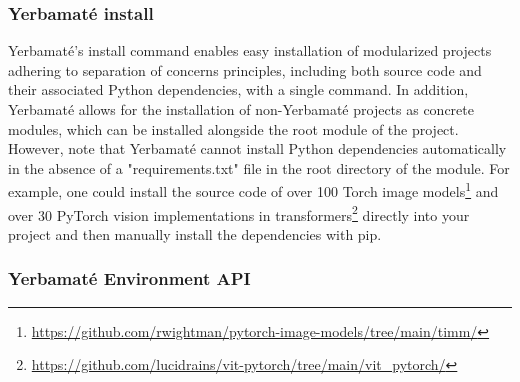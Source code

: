 \subsubsection{Yerbamaté install}
Yerbamaté's install command enables easy installation of modularized projects adhering to separation of concerns principles, including both source code and their associated Python dependencies, with a single command. In addition, Yerbamaté allows for the installation of non-Yerbamaté projects as concrete modules, which can be installed alongside the root module of the project. However, note that Yerbamaté cannot install Python dependencies automatically in the absence of a "requirements.txt" file in the root directory of the module.
For example, one could install the source code of over 100 Torch image models\footnote{\url{https://github.com/rwightman/pytorch-image-models/tree/main/timm/}} and over 30 PyTorch vision implementations in transformers\footnote{\url{https://github.com/lucidrains/vit-pytorch/tree/main/vit_pytorch/}} directly into your project and then manually install the dependencies with pip.


\subsubsection{Yerbamaté Environment API}

